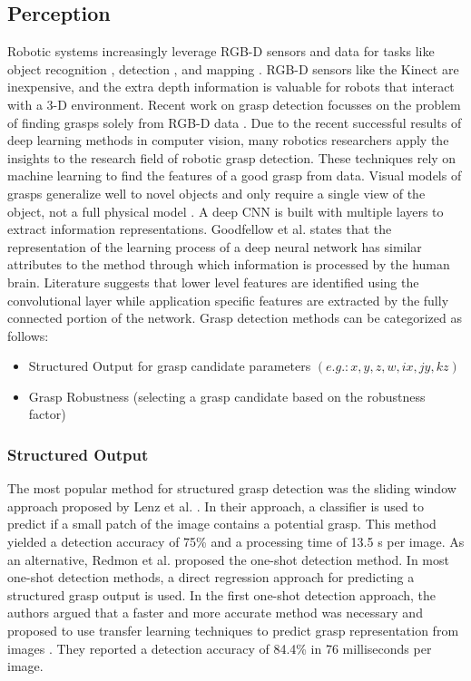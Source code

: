 \documentclass[a4paper]{article}
\begin{document}
\subsection{Perception}
\label{3_1subsec_perception}
Robotic systems increasingly leverage RGB-D sensors and data for tasks like object recognition \cite{8_lai2011large}, detection \cite{9_lai2012detection}, and mapping \cite{11_du2011rgb}. 
RGB-D sensors like the Kinect are inexpensive, and the extra depth information is valuable for robots that interact with a 3-D environment.
Recent work on grasp detection focusses on the problem of finding grasps solely from RGB-D data \cite{13_saxena2008robotic}. 
Due to the recent successful results of deep learning methods in computer vision, many robotics researchers apply the insights to the research field of robotic grasp detection.
These techniques rely on machine learning to find the features of a good grasp from data. 
Visual models of grasps generalize well to novel objects and only require a single view of the object, not a full physical model \cite{18_erhan2014scalable}.
A deep CNN is built with multiple layers to extract information representations.
Goodfellow et al. \cite{goodfellow2016deep} states that the representation of the learning process of a deep neural network has similar attributes to the method through which information is processed by the human brain. 
Literature suggests that lower level features are identified using the convolutional layer while application specific features are extracted by the fully connected portion of the network.
Grasp detection methods can be categorized as follows:
\begin{itemize}
    \item Structured Output for grasp candidate parameters $(e.g.: x, y, z, w, ix, jy, kz)$
    \item Grasp Robustness (selecting a grasp candidate based on the robustness factor)
\end{itemize}

\subsubsection{Structured Output}
The most popular method for structured grasp detection was the sliding window approach proposed by Lenz et al. \cite{18_erhan2014scalable}. 
In their approach, a classifier is used to predict if a small patch of the image contains a potential grasp.
This method yielded a detection accuracy of 75\% and a processing time of 13.5 s per image.
As an alternative, Redmon et al. \cite{19_redmon2015real} proposed the one-shot detection method.
In most one-shot detection methods, a direct regression approach for predicting a structured grasp output is used. 
In the first one-shot detection approach, the authors argued that a faster and more accurate method was necessary and proposed to use transfer learning techniques to predict grasp representation from images \cite{19_redmon2015real}. 
They reported a detection accuracy of 84.4\% in 76 milliseconds per image.
\end{document}
